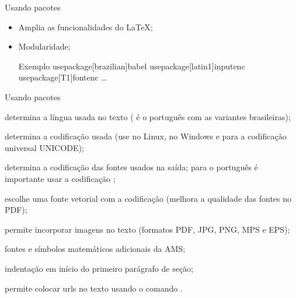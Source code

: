 \begin{frame}{Usando pacotes}
	\begin{itemize}
		\pause
		\item Amplia as funcionalidades do \LaTeX;
		\pause
		\item Modularidade;
		\pause
		\begin{Codigo}{Exemplo}
			\n
			\LOA usepackage[brazilian]{babel}\n
			\LOA usepackage[latin1]{inputenc}\n
			\LOA usepackage[T1]{fontenc}\n
			\n
			\n
			\n
			\n
			\n
			\n
			\dots\n
		\end{Codigo}
	\end{itemize}
\end{frame}

\begin{frame}{Usando pacotes}\fontsize{10}{11}\selectfont
	\begin{description}
		\pause
		\item [babel] determina a língua usada no texto (  é o português com as variantes brasileiras);
		\pause
		\item [inputenc] determina a codificação usada (use   no Linux,  no Windows e  para a codificação universal UNICODE);
		\pause
		\item [fontenc] determina a codificação das fontes usados na saída; para o português é importante usar a codificação ;
		\pause
		\item [lmodern] escolhe uma fonte vetorial com a codificação  (melhora a qualidade das fontes no PDF);
		\pause
		\item [graphicx] permite incorporar imagens no texto (formatos PDF, JPG, PNG, MPS e EPS);
		\pause
		\item [amsmath e amssymb] fontes e símbolos  matemáticos adicionais da AMS;
		\pause
		\item [indentfirst] indentação em início do primeiro parágrafo de seção;
		\pause
		\item [url] permite colocar urls no texto usando o comando .
	\end{description}
\end{frame}

